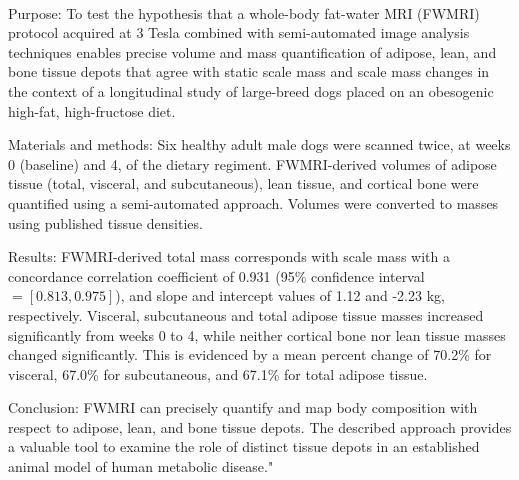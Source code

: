 {{\begin{enumerate}
\\ \aabstract
Purpose: To test the hypothesis that a whole-body fat-water MRI (FWMRI) protocol acquired at 3 Tesla combined with semi-automated image analysis techniques enables precise volume and mass quantification of adipose, lean, and bone tissue depots that agree with static scale mass and scale mass changes in the context of a longitudinal study of large-breed dogs placed on an obesogenic high-fat, high-fructose diet.

Materials and methods: Six healthy adult male dogs were scanned twice, at weeks 0 (baseline) and 4, of the dietary regiment. FWMRI-derived volumes of adipose tissue (total, visceral, and subcutaneous), lean tissue, and cortical bone were quantified using a semi-automated approach. Volumes were converted to masses using published tissue densities.

Results: FWMRI-derived total mass corresponds with scale mass with a concordance correlation coefficient of 0.931 (95\% confidence interval $= [0.813, 0.975]$), and slope and intercept values of 1.12 and -2.23 kg, respectively. Visceral, subcutaneous and total adipose tissue masses increased significantly from weeks 0 to 4, while neither cortical bone nor lean tissue masses changed significantly. This is evidenced by a mean percent change of 70.2\% for visceral, 67.0\% for subcutaneous, and 67.1\% for total adipose tissue.

Conclusion: FWMRI can precisely quantify and map body composition with respect to adipose, lean, and bone tissue depots. The described approach provides a valuable tool to examine the role of distinct tissue depots in an established animal model of human metabolic disease."
 

\end{enumerate}}}
